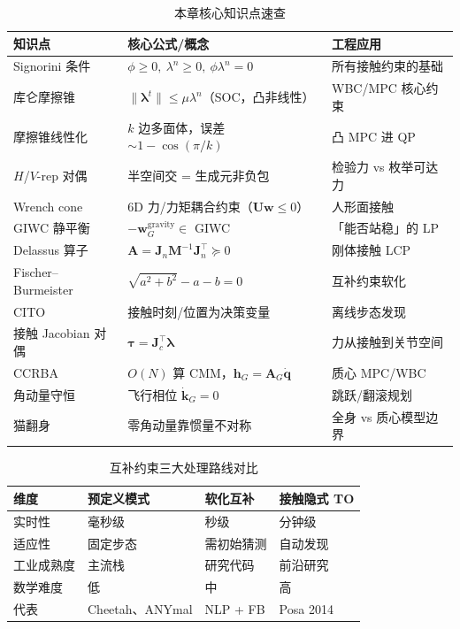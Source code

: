 \begin{table}[H]\centering\small
\caption{本章核心知识点速查}
\label{tab:contact-summary}
\begin{tabular}{lll}
\toprule
知识点 & 核心公式/概念 & 工程应用 \\
\midrule
Signorini 条件 & $\phi\ge0,\ \lambda^n\ge0,\ \phi\lambda^n=0$ & 所有接触约束的基础 \\
库仑摩擦锥 & $\|\boldsymbol{\lambda}^t\|\le\mu\lambda^n$（SOC，凸非线性）& WBC/MPC 核心约束 \\
摩擦锥线性化 & $k$ 边多面体，误差 $\sim1-\cos(\pi/k)$ & 凸 MPC 进 QP \\
$H$/$V$-rep 对偶 & 半空间交 = 生成元非负包 & 检验力 vs 枚举可达力 \\
Wrench cone & 6D 力/力矩耦合约束（$\mathbf{U}\boldsymbol{w}\le0$）& 人形面接触 \\
GIWC 静平衡 & $-\boldsymbol{w}_G^{\mathrm{gravity}}\in$ GIWC & 「能否站稳」的 LP \\
Delassus 算子 & $\mathbf{A}=\mathbf{J}_n\mathbf{M}^{-1}\mathbf{J}_n^\top\succeq0$ & 刚体接触 LCP \\
Fischer--Burmeister & $\sqrt{a^2+b^2}-a-b=0$ & 互补约束软化 \\
CITO & 接触时刻/位置为决策变量 & 离线步态发现 \\
接触 Jacobian 对偶 & $\boldsymbol{\tau}=\mathbf{J}_c^\top\boldsymbol{\lambda}$ & 力从接触到关节空间 \\
CCRBA & $O(N)$ 算 CMM，$\boldsymbol{h}_G=\mathbf{A}_G\dot{\boldsymbol{q}}$ & 质心 MPC/WBC \\
角动量守恒 & 飞行相位 $\dot{\boldsymbol{k}}_G=0$ & 跳跃/翻滚规划 \\
猫翻身 & 零角动量靠惯量不对称 & 全身 vs 质心模型边界 \\
\bottomrule
\end{tabular}
\end{table}

\begin{table}[H]\centering\small
\caption{互补约束三大处理路线对比}
\label{tab:three-routes}
\begin{tabular}{llll}
\toprule
维度 & 预定义模式 & 软化互补 & 接触隐式 TO \\
\midrule
实时性 & 毫秒级 & 秒级 & 分钟级 \\
适应性 & 固定步态 & 需初始猜测 & 自动发现 \\
工业成熟度 & 主流栈 & 研究代码 & 前沿研究 \\
数学难度 & 低 & 中 & 高 \\
代表 & Cheetah、ANYmal & NLP + FB & Posa 2014 \\
\bottomrule
\end{tabular}
\end{table}

